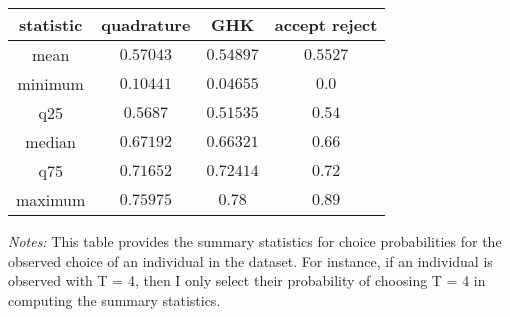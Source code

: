 \begin{tabular}{cccc}
\toprule
statistic & quadrature & GHK & accept reject\\
\toprule
mean & $0.57043$ & $0.54897$ & $0.5527$\\
minimum & $0.10441$ & $0.04655$ & $0.0$\\
q25 & $0.5687$ & $0.51535$ & $0.54$\\
median & $0.67192$ & $0.66321$ & $0.66$\\
q75 & $0.71652$ & $0.72414$ & $0.72$\\
maximum & $0.75975$ & $0.78$ & $0.89$\\
\toprule
\end{tabular}
\par \medskip 
\begin{minipage}[!htbp]{0.8 \textwidth}
{\small \textit{Notes:} This table provides the summary statistics for choice probabilities for the observed choice of an individual in the dataset. For instance, if an individual is observed with T = 4, then I only select their probability of choosing T = 4 in computing the summary statistics.}
\end{minipage}